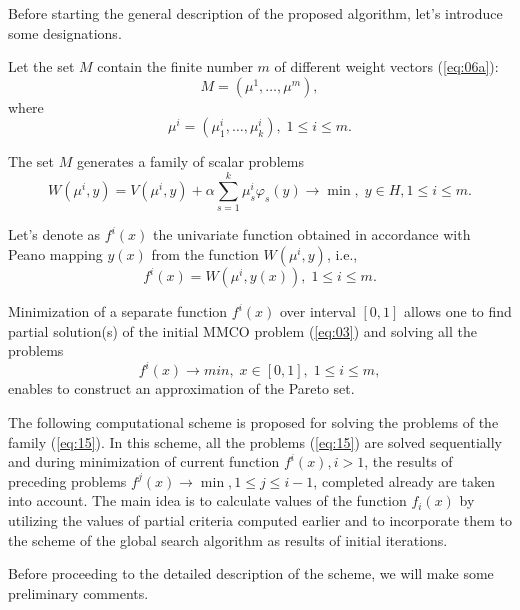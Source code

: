 \documentclass[runningheads]{llncs}
\begin{document}
Before starting the general description of the proposed algorithm, let's introduce some designations. 

Let the set $M$ contain the finite number $m$ of different weight vectors (\ref{eq:06a}):
\begin{equation}
    \label{eq:11}
    M=(\mu^1, \dots, \mu^m),
\end{equation}
where
\begin{equation}
    \label{eq:12}
    \mu^i=(\mu^i_1, \dots, \mu^i_k), \; 1 \leq i \leq m.
\end{equation}

The set $M$ generates a family   of scalar problems 
\begin{equation}
    \label{eq:13}
    W(\mu^i, y)= V(\mu^i, y) + \alpha \sum^k_{s=1}\mu^i_s \varphi_s (y) \to \min, \; y \in H, 1 \leq i \leq m.
\end{equation}

Let's denote as $f^i(x)$ the univariate function obtained in accordance with Peano mapping $y(x)$ from the function $W(\mu^i, y)$, i.e.,
\begin{equation}
    \label{eq:14}
    f^i(x) = W(\mu^i, y(x)), \; 1 \leq i \leq m.
\end{equation}

Minimization of a separate function $f^i(x)$ over interval $[0,1]$ allows one to find partial solution(s) of the initial MMCO problem (\ref{eq:03}) and solving all the problems
\begin{equation}
    \label{eq:15}
    f^i(x) \to min, \; x \in [0,1], \; 1 \leq i \leq m,
\end{equation}
enables to construct an approximation of the Pareto set.

The following computational scheme is proposed for solving the problems of the family (\ref{eq:15}). In this scheme, all the problems (\ref{eq:15}) are solved sequentially and during minimization of current function $f^i(x), i > 1$, the results of preceding problems $f^j(x) \to \min, 1 \leq j \leq i - 1$, completed already are taken into account. The main idea is to calculate values of the function $f_i(x)$ by utilizing the values of partial criteria computed earlier and to incorporate them to the scheme of the global search algorithm as results of initial iterations.


Before proceeding to the detailed description of the scheme, we will make some preliminary comments. 
\end{document}
